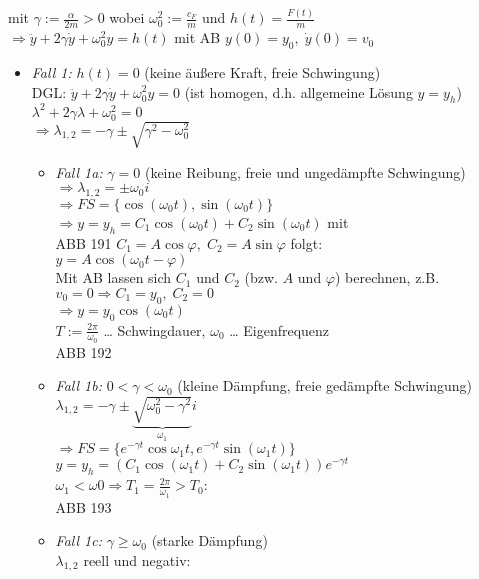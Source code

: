 mit $\gamma:= \frac{\alpha}{2m}>0$ wobei $\omega_0^2:= \frac{c_F}{m}$ und $h(t)=\frac{F(t)}{m}$\\
$\Rightarrow \boxed{\ddot{y}+2\gamma \dot{y}+\omega_0^2y=h(t)}$ mit AB $y(0)=y_0, \; \dot{y}(0)=v_0$
\begin{itemize}
\item \emph{Fall 1:} $h(t) = 0$ (keine äußere Kraft, freie Schwingung)\\
DGL: $\ddot{y}+2\gamma \dot{y}+\omega_0^2y=0$ (ist homogen, d.h. allgemeine Lösung $y=y_h$)\\
$\lambda^2+2\gamma \lambda + \omega_0^2=0$\\
$\Rightarrow \lambda_{1,2}= -\gamma \pm \sqrt{\gamma^2-\omega_0^2}$
\begin{itemize}
\item \emph{Fall 1a:} $\gamma = 0$ (keine Reibung, freie und ungedämpfte Schwingung)\\
$\Rightarrow \lambda_{1,2}=\pm \omega_0 i$\\
$\Rightarrow FS=\{\cos (\omega_0 t) , \sin (\omega_0t)\}$\\
$\Rightarrow y= y_h = C_1 \cos (\omega_0 t)+C_2 \sin (\omega_0 t)$ mit\\
ABB 191 $C_1=A \cos \varphi, \; C_2=A \sin \varphi$ folgt:\\
$y=A\cos(\omega_0 t - \varphi)$\\
Mit AB lassen sich $C_1$ und $C_2$ (bzw. $A$ und $\varphi$) berechnen, z.B. $v_0=0 \Rightarrow C_1=y_0, \; C_2=0$\\
$\Rightarrow y=y_0 \cos (\omega_0 t)$\\
$T:= \frac{2\pi}{\omega_0}$ … Schwingdauer, $\omega_0$ … Eigenfrequenz\\
ABB 192
\item \emph{Fall 1b:} $0 < \gamma < \omega_0$ (kleine Dämpfung, freie gedämpfte Schwingung)\\
$\lambda_{1,2}=-\gamma \pm \underbrace{\sqrt{\omega_0^2-\gamma^2}}_{\omega_1}i$\\
$\Rightarrow FS = \{ e^{-\gamma t} \cos {\omega_1 t}, e^{-\gamma t} \sin (\omega_1 t)\}$\\
$y=y_h = (C_1 \cos (\omega_1 t) + C_2 \sin (\omega_1 t))e^{-\gamma t}$\\
$\omega_1<\omega 0 \Rightarrow T_1 = \frac{2\pi}{\omega_1}>T_0$:\\
ABB 193
\item \emph{Fall 1c:} $\gamma \geq \omega_0$ (starke Dämpfung)\\
$\lambda_{1,2}$ reell und negativ:\\

\end{itemize}
\end{itemize}
